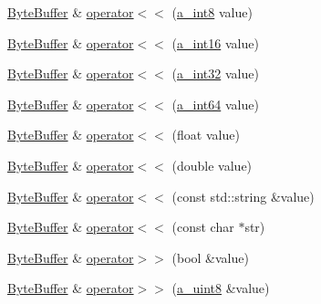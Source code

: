 \begin{DoxyCompactItemize}
\item 
\hyperlink{class_agmd_network_1_1_byte_buffer}{Byte\+Buffer} \& \hyperlink{class_agmd_network_1_1_byte_buffer_a9b4fb66a85980e3e5ae522c8ef47021d}{operator$<$$<$} (\hyperlink{_common_defines_8h_a29a7f712ca0e13d1cc6485d440fd7ca5}{a\+\_\+int8} value)
\item 
\hyperlink{class_agmd_network_1_1_byte_buffer}{Byte\+Buffer} \& \hyperlink{class_agmd_network_1_1_byte_buffer_a1ac60a2bcb5a7dd64451fee162b7821f}{operator$<$$<$} (\hyperlink{_common_defines_8h_a6e749f7b48811016d7aa0f0046b2d849}{a\+\_\+int16} value)
\item 
\hyperlink{class_agmd_network_1_1_byte_buffer}{Byte\+Buffer} \& \hyperlink{class_agmd_network_1_1_byte_buffer_a8135db569d252e48c28621b321282bdb}{operator$<$$<$} (\hyperlink{_common_defines_8h_ae2e4316e0b924774484a728669bebc9b}{a\+\_\+int32} value)
\item 
\hyperlink{class_agmd_network_1_1_byte_buffer}{Byte\+Buffer} \& \hyperlink{class_agmd_network_1_1_byte_buffer_a1283e00a625e2ecde7ac15cfd45d4c4e}{operator$<$$<$} (\hyperlink{_common_defines_8h_aef7f6b0e5e05482b56bd478f250ba0a9}{a\+\_\+int64} value)
\item 
\hyperlink{class_agmd_network_1_1_byte_buffer}{Byte\+Buffer} \& \hyperlink{class_agmd_network_1_1_byte_buffer_a6361b9b18f28495de6803846bd0c9db1}{operator$<$$<$} (float value)
\item 
\hyperlink{class_agmd_network_1_1_byte_buffer}{Byte\+Buffer} \& \hyperlink{class_agmd_network_1_1_byte_buffer_ad81f0e8f77aed84ddaaf4a22b88c76a0}{operator$<$$<$} (double value)
\item 
\hyperlink{class_agmd_network_1_1_byte_buffer}{Byte\+Buffer} \& \hyperlink{class_agmd_network_1_1_byte_buffer_a86a02a642d6850baf5acf48940ec5264}{operator$<$$<$} (const std\+::string \&value)
\item 
\hyperlink{class_agmd_network_1_1_byte_buffer}{Byte\+Buffer} \& \hyperlink{class_agmd_network_1_1_byte_buffer_a0fb671a735307fd1b32f6473f81505fc}{operator$<$$<$} (const char $\ast$str)
\item 
\hyperlink{class_agmd_network_1_1_byte_buffer}{Byte\+Buffer} \& \hyperlink{class_agmd_network_1_1_byte_buffer_a8ceac1e6657106773c9302af4a438d3c}{operator$>$$>$} (bool \&value)
\item 
\hyperlink{class_agmd_network_1_1_byte_buffer}{Byte\+Buffer} \& \hyperlink{class_agmd_network_1_1_byte_buffer_a1ee6851c35c698babb9feb8060ced016}{operator$>$$>$} (\hyperlink{_common_defines_8h_afbe6c09973474a1f78f870f39073398f}{a\+\_\+uint8} \&value)

\end{DoxyCompactItemize}

